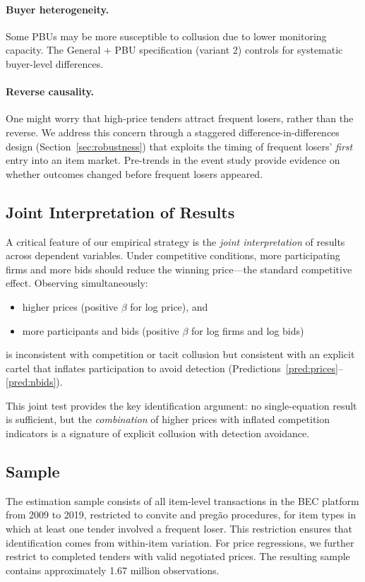 \paragraph{Buyer heterogeneity.} Some PBUs may be more susceptible to collusion due to lower monitoring capacity. The General + PBU specification (variant 2) controls for systematic buyer-level differences.

\paragraph{Reverse causality.} One might worry that high-price tenders attract frequent losers, rather than the reverse. We address this concern through a staggered difference-in-differences design (Section~\ref{sec:robustness}) that exploits the timing of frequent losers' \emph{first} entry into an item market. Pre-trends in the event study provide evidence on whether outcomes changed before frequent losers appeared.

\subsection{Joint Interpretation of Results}

A critical feature of our empirical strategy is the \emph{joint interpretation} of results across dependent variables. Under competitive conditions, more participating firms and more bids should reduce the winning price---the standard competitive effect. Observing simultaneously:
\begin{itemize}
  \item higher prices (positive $\beta$ for log price), and
  \item more participants and bids (positive $\beta$ for log firms and log bids)
\end{itemize}
is inconsistent with competition or tacit collusion but consistent with an explicit cartel that inflates participation to avoid detection (Predictions~\ref{pred:prices}--\ref{pred:nbids}).

This joint test provides the key identification argument: no single-equation result is sufficient, but the \emph{combination} of higher prices with inflated competition indicators is a signature of explicit collusion with detection avoidance.

\subsection{Sample}

The estimation sample consists of all item-level transactions in the BEC platform from 2009 to 2019, restricted to convite and preg\~{a}o procedures, for item types in which at least one tender involved a frequent loser. This restriction ensures that identification comes from within-item variation. For price regressions, we further restrict to completed tenders with valid negotiated prices. The resulting sample contains approximately 1.67 million observations.

